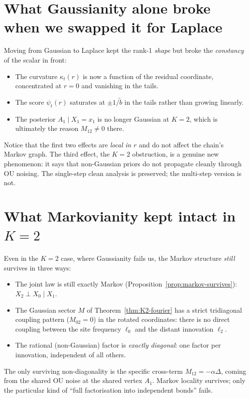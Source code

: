 \documentclass[11pt,a4paper,openany]{book}
\theoremstyle{plainserif}
\theoremstyle{definition}
\theoremstyle{remarkstyle}
\newcommand{\btilde}{\tilde{b}}
\begin{document}
\section{What Gaussianity alone broke when we swapped it for Laplace}

Moving from Gaussian to Laplace kept the rank-1 \emph{shape} but broke the
\emph{constancy} of the scalar in front:
\begin{itemize}[leftmargin=2em]
\item The curvature $\kappa_t(r)$ is now a function of the residual
coordinate, concentrated at $r=0$ and vanishing in the tails.
\item The score $\psi_t(r)$ saturates at $\pm 1/\btilde$ in the tails
rather than growing linearly.
\item The posterior $A_1\mid X_1 = x_1$ is no longer Gaussian at $K=2$,
which is ultimately the reason $M_{12} \neq 0$ there.
\end{itemize}

Notice that the first two effects are \emph{local in $r$} and do not
affect the chain's Markov graph. The third effect, the $K=2$
obstruction, is a genuine new phenomenon: it says that non-Gaussian
priors do not propagate cleanly through OU noising. The single-step
clean analysis is preserved; the multi-step version is not.

\section{What Markovianity kept intact in $K{=}2$}

Even in the $K=2$ case, where Gaussianity fails us, the Markov structure
\emph{still} survives in three ways:
\begin{itemize}[leftmargin=2em]
\item The joint law is still exactly Markov (Proposition~\ref{prop:markov-survives}):
$X_2 \perp X_0 \mid X_1$.
\item The Gaussian sector $M$ of Theorem~\ref{thm:K2-fourier} has a
strict tridiagonal coupling pattern ($M_{02} = 0$) in the rotated
coordinates: there is no direct coupling between the site frequency
$\ell_0$ and the distant innovation $\ell_2$.
\item The rational (non-Gaussian) factor is \emph{exactly diagonal}:
one factor per innovation, independent of all others.
\end{itemize}

The only surviving non-diagonality is the specific cross-term
$M_{12} = -\alpha\Delta$, coming from the shared OU noise at the shared
vertex $A_1$. Markov locality survives; only the particular kind of
``full factorisation into independent bonds'' fails.
\end{document}
